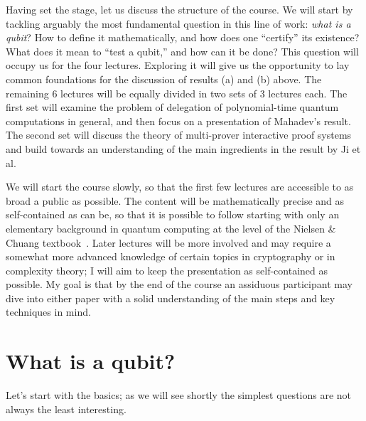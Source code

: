 Having set the stage, let us discuss the structure of the course. We will start by tackling arguably the most fundamental question in this line of work: \emph{what is a qubit}? How to define it mathematically, and how does one ``certify'' its existence? What does it mean to ``test a qubit,'' and how can it be done? This question will occupy us for the four lectures. Exploring it will give us the opportunity to lay common foundations for the discussion of results (a) and (b) above. The remaining 6 lectures will be equally divided in two sets of 3 lectures each. The first set will examine the problem of delegation of polynomial-time quantum computations in general, and then focus on a presentation of Mahadev's result. The second set will discuss the theory of multi-prover interactive proof systems and build towards an understanding of the main ingredients in the result by Ji et al.

We will start the course slowly, so that the first few lectures are accessible to as broad a public as possible. The content will be mathematically precise and as self-contained as can be, so that it is possible to follow starting with only an elementary background in quantum computing at the level of the Nielsen \& Chuang textbook~\cite{nielsen2002quantum}. Later lectures will be more involved and may require a somewhat more advanced knowledge of certain topics in cryptography or in complexity theory; I will aim to keep the presentation as self-contained as possible. My goal is that by the end of the course an assiduous participant may dive into either paper with a solid understanding of the main steps and key techniques in mind. 



\section{What is a qubit?}

Let's start with the basics; as we will see shortly the simplest questions are not always the least interesting. 


